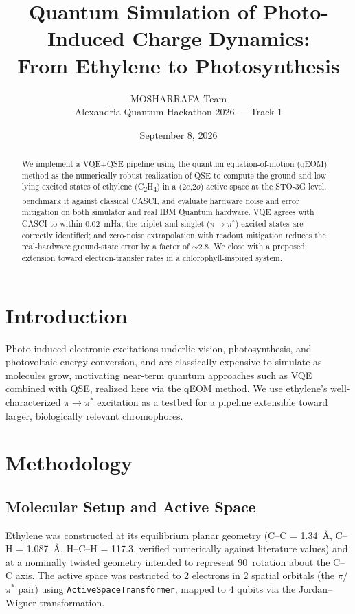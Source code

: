 \documentclass[10pt]{article}
\title{Quantum Simulation of Photo-Induced Charge Dynamics:\\From Ethylene to Photosynthesis}
\author{MOSHARRAFA Team \\ Alexandria Quantum Hackathon 2026 --- Track 1}
\date{September 8, 2026}
\begin{document}
\maketitle

\begin{abstract}
We implement a VQE+QSE pipeline using the quantum equation-of-motion
(qEOM) method as the numerically robust realization of QSE to compute the
ground and low-lying excited states of ethylene (C\textsubscript{2}H\textsubscript{4})
in a (2$e$,2$o$) active space at the STO-3G level, benchmark it against
classical CASCI, and evaluate hardware noise and error mitigation on both
simulator and real IBM Quantum hardware. VQE agrees with CASCI to within
0.02~mHa; the triplet and singlet ($\pi\to\pi^*$) excited states are
correctly identified; and zero-noise extrapolation with readout mitigation
reduces the real-hardware ground-state error by a factor of $\sim$2.8. We
close with a proposed extension toward electron-transfer rates in a
chlorophyll-inspired system.
\end{abstract}

\section{Introduction}
Photo-induced electronic excitations underlie vision, photosynthesis, and
photovoltaic energy conversion, and are classically expensive to simulate as
molecules grow, motivating near-term quantum approaches such as VQE combined
with QSE, realized here via the qEOM method. We use ethylene's
well-characterized $\pi\to\pi^*$ excitation as a testbed for a pipeline
extensible toward larger, biologically relevant chromophores.

\section{Methodology}

\subsection{Molecular Setup and Active Space}
Ethylene was constructed at its equilibrium planar geometry
(C--C = 1.34~\AA, C--H = 1.087~\AA, H--C--H = 117.3\textdegree, verified
numerically against literature values) and at a nominally twisted geometry
intended to represent 90\textdegree\ rotation about the C--C axis. The active
space was restricted to 2 electrons in 2 spatial orbitals (the
$\pi$/$\pi^*$ pair) using \texttt{ActiveSpaceTransformer}, mapped to 4 qubits
via the Jordan--Wigner transformation.
\end{document}

